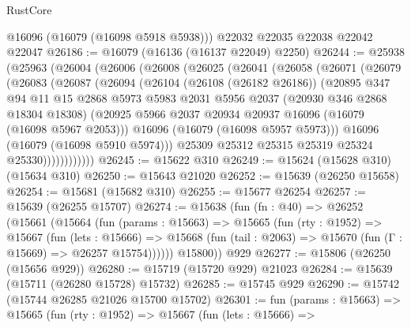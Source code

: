 \begin{lexlean}{RustCore}
\begin{coremodule}
      @16096
      (@16079 (@16098 @5918 @5938)))
    @22032
    @22035
    @22038
    @22042
    @22047
@26186 := @16079 (@16136 (@16137 @22049) @2250)
@26244 := @25938
    (@25963
      (@26004
        (@26006
          (@26008
            (@26025
              (@26041
                (@26058
                  (@26071
                    (@26079
                      (@26083
                        (@26087
                          (@26094
                            (@26104
                              (@26108 (@26182 @26186))
                              (@20895
                                @347
                                @94
                                @11
                                @15
                                @2868
                                @5973
                                @5983
                                @2031
                                @5956
                                @2037
                                (@20930 @346 @2868 @18304 @18308)
                                (@20925
                                  @5966
                                  @2037
                                  @20934
                                  @20937
                                  @16096
                                  (@16079 (@16098 @5967 @2053)))
                                @16096
                                (@16079 (@16098 @5957 @5973)))
                              @16096
                              (@16079 (@16098 @5910 @5974)))
                            @25309
                            @25312
                            @25315
                            @25319
                            @25324
                            @25330))))))))))))
@26245 := @15622 @310
@26249 := @15624 (@15628 @310) (@15634 @310)
@26250 := @15643 @21020
@26252 := @15639 (@26250 @15658)
@26254 := @15681 (@15682 @310)
@26255 := @15677 @26254
@26257 := @15639 (@26255 @15707)
@26274 := @15638
    (fun (fn : @40) =>
    @26252
      (@15661
        (@15664
          (fun (params : @15663) =>
          @15665
            (fun (rty : @1952) =>
            @15667
              (fun (lets : @15666) =>
              @15668 (fun (tail : @2063) => @15670 (fun (Γ : @15669) => @26257 @15754))))))
        @15800))
    @929
@26277 := @15806 (@26250 (@15656 @929))
@26280 := @15719 (@15720 @929) @21023
@26284 := @15639 (@15711 (@26280 @15728) @15732)
@26285 := @15745 @929
@26290 := @15742 (@15744 @26285 @21026 @15700 @15702)
@26301 := fun (params : @15663) =>
  @15665
    (fun (rty : @1952) =>
    @15667
      (fun (lets : @15666) =>

\end{coremodule}
\end{lexlean}
